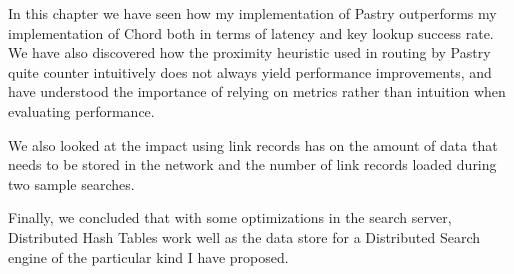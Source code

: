 \mbox{}

In this chapter we have seen how my implementation of Pastry outperforms my implementation of Chord both in terms of latency and key lookup success rate.
We have also discovered how the proximity heuristic used in routing by Pastry quite counter intuitively does not always yield performance improvements, and have understood the importance of relying on metrics rather than intuition when evaluating performance.

We also looked at the impact using link records has on the amount of data that needs to be stored in the network and the number of link records loaded during two sample searches.

Finally, we concluded that with some optimizations in the search server, Distributed Hash Tables work well as the data store for a Distributed Search engine of the particular kind I have proposed.
